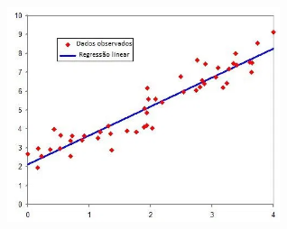 \documentclass[conference]{IEEEtran}
\begin{document}
\vspace{7mm}
\centerline{\includegraphics[width=80mm,height=600mm,keepaspectratio]{ExRegressaoLinear.png}}
\vspace{7mm}
\end{document}
